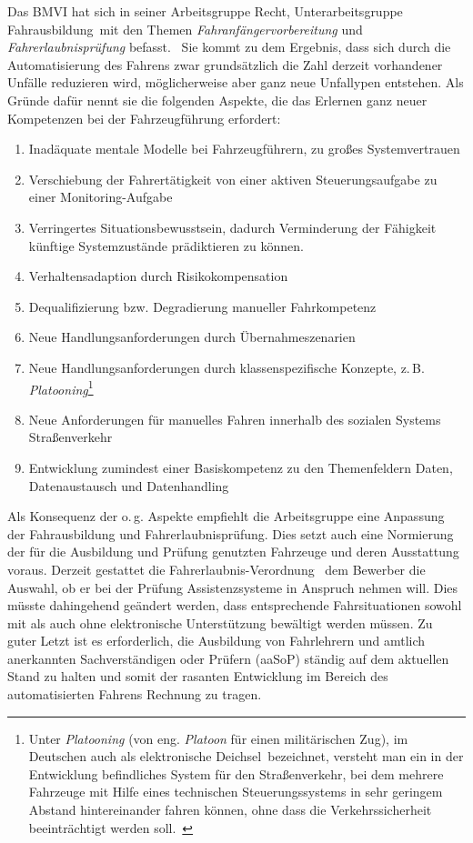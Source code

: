 \documentclass[twoside,a4paper,12pt]{article}
\begin{document}
Das BMVI hat sich in seiner Arbeitsgruppe \glqq Recht\grqq, Unterarbeitsgruppe \glqq Fahrausbildung\grqq\, mit den Themen
\textit{Fahranfängervorbereitung} und \textit{Fahrerlaubnisprüfung} befasst.\mbox{~\cite[S. 26ff]{bmvi2}} Sie kommt zu dem Ergebnis, dass sich durch die
Automatisierung des Fahrens zwar grundsätzlich die Zahl derzeit vorhandener Unfälle reduzieren wird, möglicherweise aber ganz neue Unfallypen entstehen. Als Gründe dafür nennt sie
die folgenden Aspekte, die das Erlernen ganz neuer Kompetenzen bei der Fahrzeugführung erfordert:
\begin{enumerate}
\item Inadäquate mentale Modelle bei Fahrzeugführern, zu großes Systemvertrauen
\item Verschiebung der Fahrertätigkeit von einer aktiven Steuerungsaufgabe zu einer Monitoring-Aufgabe
\item Verringertes Situationsbewusstsein, dadurch Verminderung der Fähigkeit künftige Systemzustände prädiktieren zu können.
\item Verhaltensadaption durch Risikokompensation
\item Dequalifizierung bzw. Degradierung manueller Fahrkompetenz
\item Neue Handlungsanforderungen durch Übernahmeszenarien
\item Neue Handlungsanforderungen durch klassenspezifische Konzepte, z.\,B. \textit{Platooning}\footnote{Unter \textit{Platooning} (von eng. \textit{Platoon} für einen militärischen Zug), im Deutschen auch als \glqq elektronische Deichsel\grqq\ bezeichnet, versteht man ein in der Entwicklung befindliches System für den Straßenverkehr, bei dem mehrere Fahrzeuge mit 
Hilfe eines technischen Steuerungssystems in sehr geringem Abstand hintereinander fahren können, ohne dass die Verkehrssicherheit beeinträchtigt werden soll.~\cite{wi}}
\item Neue Anforderungen für manuelles Fahren innerhalb des sozialen Systems Straßenverkehr
\item Entwicklung zumindest einer Basiskompetenz zu den Themenfeldern Daten, Datenaustausch und Datenhandling
\end{enumerate}

Als Konsequenz der o.\,g. Aspekte empfiehlt die Arbeitsgruppe eine Anpassung der Fahrausbildung und Fahrerlaubnisprüfung. Dies setzt auch eine Normierung der für die
Ausbildung und Prüfung genutzten Fahrzeuge und deren Ausstattung voraus. Derzeit gestattet die Fahrerlaubnis-Verordnung~\cite{bmjv} dem Bewerber die Auswahl, ob er bei der Prüfung
Assistenzsysteme in Anspruch nehmen will. Dies müsste dahingehend geändert werden, dass entsprechende Fahrsituationen sowohl mit als auch ohne elektronische Unterstützung
bewältigt werden müssen. Zu guter Letzt ist es erforderlich, die Ausbildung von Fahrlehrern und amtlich anerkannten Sachverständigen oder Prüfern (aaSoP) ständig auf dem
aktuellen Stand zu halten und somit der rasanten Entwicklung im Bereich des automatisierten Fahrens Rechnung zu tragen.
\end{document}
